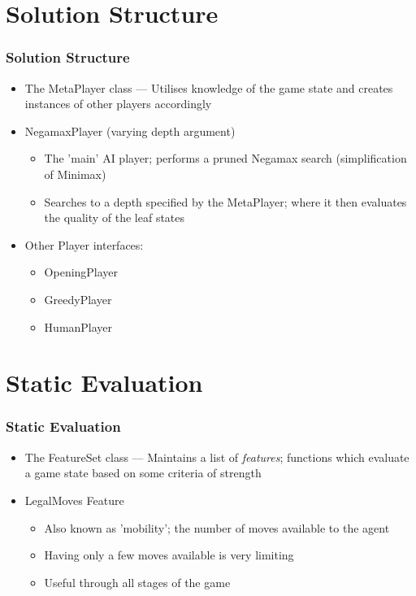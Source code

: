\documentclass[10pt]{beamer}
\begin{document}
\section{Solution Structure}

\begin{frame}
  \frametitle{Solution Structure}   %
  \begin{itemize}
  \item<1-> The MetaPlayer class --- Utilises knowledge of the game state and 
        creates instances of other players accordingly
  \item<2-> NegamaxPlayer (varying depth argument)
  \begin{itemize}
    \item<2-> The 'main' AI player; performs a pruned Negamax search (simplification of Minimax)
    \item<2-> Searches to a depth specified by the MetaPlayer; where it then
    evaluates the quality of the leaf states
  \end{itemize}
  \item<3-> Other Player interfaces:
  \begin{itemize}
    \item<3-> OpeningPlayer
    \item<3-> GreedyPlayer
    \item<3-> HumanPlayer
  \end{itemize}
  \end{itemize}
\end{frame}

\section{Static Evaluation}

\begin{frame}
  \frametitle{Static Evaluation}   %
  \begin{itemize}
  \item<1-> The FeatureSet class --- Maintains a list of \emph{features}; functions
  which evaluate a game state based on some criteria of strength
  \item<2-> LegalMoves Feature
  \begin{itemize}
    \item<2-> Also known as 'mobility'; the number of moves available to the agent
    \item<2-> Having only a few moves available is very limiting
    \item<2-> Useful through all stages of the game
  \end{itemize}
  \end{itemize}
\end{frame}
\end{document}

